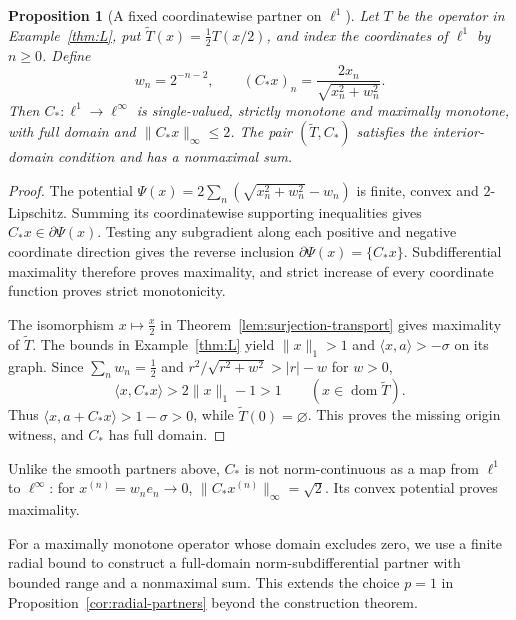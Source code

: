\documentclass[11pt]{article}
\newcommand{\dom}{\operatorname{dom}}
\newcommand{\pair}[2]{\langle #1,#2\rangle}
\newtheorem{proposition}{Proposition}
\theoremstyle{definition}
\theoremstyle{remark}
\begin{document}
\begin{proposition}[A fixed coordinatewise partner on $\ell^1$]
\label{cor:fixed-coordinate-partner}
Let $T$ be the operator in Example~\ref{thm:L}, put $\widetilde T(x)=\frac12T(x/2)$, and index the coordinates of $\ell^1$ by $n\ge0$. Define
\[
w_n=2^{-n-2},\qquad (C_*x)_n=\frac{2x_n}{\sqrt{x_n^2+w_n^2}}.
\]
Then $C_*:\ell^1\to\ell^\infty$ is single-valued, strictly monotone and maximally monotone, with full domain and $\|C_*x\|_\infty\le2$. The pair $(\widetilde T,C_*)$ satisfies the interior-domain condition and has a nonmaximal sum.
\end{proposition}
\begin{proof}
The potential $\Psi(x)=2\sum_n(\sqrt{x_n^2+w_n^2}-w_n)$ is finite, convex and $2$-Lipschitz. Summing its coordinatewise supporting inequalities gives $C_*x\in\partial\Psi(x)$. Testing any subgradient along each positive and negative coordinate direction gives the reverse inclusion $\partial\Psi(x)=\{C_*x\}$. Subdifferential maximality therefore proves maximality, and strict increase of every coordinate function proves strict monotonicity.

The isomorphism $x\mapsto \frac{x}{2}$ in Theorem~\ref{lem:surjection-transport} gives maximality of $\widetilde T$. The bounds in Example~\ref{thm:L} yield $\|x\|_1>1$ and $\pair{x}{a}>-\sigma$ on its graph. Since $\sum_nw_n=\frac12$ and $r^2/\sqrt{r^2+w^2}>|r|-w$ for $w>0$,
\[
\pair{x}{C_*x}>2\|x\|_1-1>1\qquad(x\in\dom\widetilde T).
\]
Thus $\pair{x}{a+C_*x}>1-\sigma>0$, while $\widetilde T(0)=\varnothing$. This proves the missing origin witness, and $C_*$ has full domain.
\end{proof}

Unlike the smooth partners above, $C_*$ is not norm-continuous as a map from $\ell^1$ to $\ell^\infty$: for $x^{(n)}=w_ne_n\to0$, $\|C_*x^{(n)}\|_\infty=\sqrt2$. Its convex potential proves maximality.

For a maximally monotone operator whose domain excludes zero, we use a finite radial bound to construct a full-domain norm-subdifferential partner with bounded range and a nonmaximal sum. This extends the choice $p=1$ in Proposition~\ref{cor:radial-partners} beyond the construction theorem.
\end{document}

